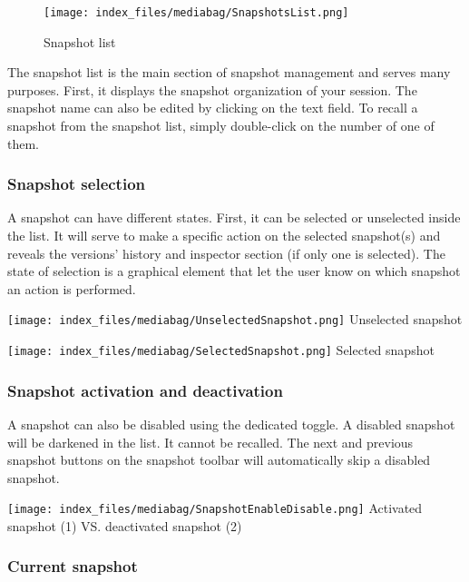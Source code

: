\documentclass[
  letterpaper,
  DIV=11,
  numbers=noendperiod]{scrreport}
\begin{document}
\begin{figure}

{\centering \texttt{[image: index\_files/mediabag/SnapshotsList.png]}

}

\caption{Snapshot list}

\end{figure}

The snapshot list is the main section of snapshot management and serves
many purposes. First, it displays the snapshot organization of your
session. The snapshot name can also be edited by clicking on the text
field. To recall a snapshot from the snapshot list, simply double-click
on the number of one of them.

\hypertarget{snapshot-selection}{%
\subsubsection{Snapshot selection}\label{snapshot-selection}}

A snapshot can have different states. First, it can be selected or
unselected inside the list. It will serve to make a specific action on
the selected snapshot(s) and reveals the versions' history and inspector
section (if only one is selected). The state of selection is a graphical
element that let the user know on which snapshot an action is performed.

\texttt{[image: index\_files/mediabag/UnselectedSnapshot.png]} Unselected
snapshot

\texttt{[image: index\_files/mediabag/SelectedSnapshot.png]} Selected
snapshot

\hypertarget{snapshot-activation-and-deactivation}{%
\subsubsection{Snapshot activation and
deactivation}\label{snapshot-activation-and-deactivation}}

A snapshot can also be disabled using the dedicated toggle. A disabled
snapshot will be darkened in the list. It cannot be recalled. The next
and previous snapshot buttons on the snapshot toolbar will automatically
skip a disabled snapshot.

\texttt{[image: index\_files/mediabag/SnapshotEnableDisable.png]}
Activated snapshot (1) VS. deactivated snapshot (2)

\hypertarget{current-snapshot}{%
\subsubsection{Current snapshot}\label{current-snapshot}}
\end{document}
